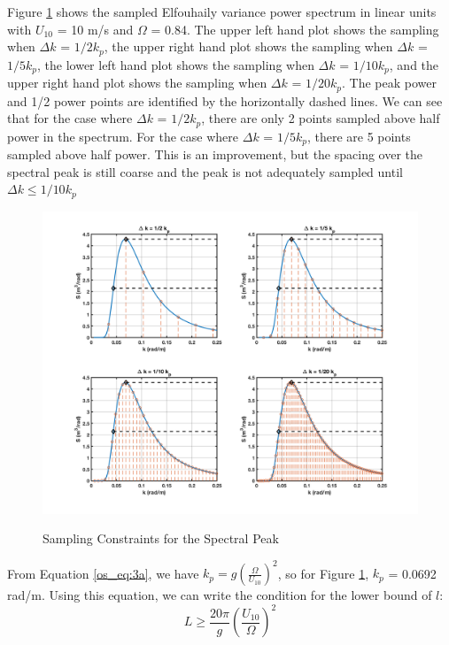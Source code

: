 Figure \ref{os_fig:6ba} shows the sampled Elfouhaily variance power spectrum in linear units with $U_{10}$ = 10 m/s and $\Omega$ = 0.84.  The upper left hand plot shows the sampling when $\Delta k$ = $1/2 k_p$, the upper right hand plot shows the sampling when $\Delta k$ = $1/5 k_p$, the lower left hand plot shows the sampling when $\Delta k$ = $1/10 k_p$, and the upper right hand plot shows the sampling when $\Delta k$ = $1/20 k_p$. The peak power and 1/2 power points are identified by the horizontally dashed lines. We can see that for the case where $\Delta k$ = $1/2 k_p$, there are only 2 points sampled above half power in the spectrum. For the case where $\Delta k$ = $1/5 k_p$, there are 5 points sampled above half power. This is an improvement, but the spacing over the spectral peak is still coarse and the peak is not adequately sampled until $\Delta k \leq 1/10 k_p$
\begin{figure}[H]
  \begin{center}
\includegraphics[width=6in]{../media/Ocean_Surface/spectral_peak_sampling.png}
  \end{center}
  \renewcommand{\baselinestretch}{1} \small\normalsize
  \begin{quote}
    \caption[Sampling Constraints for the Spectral Peak]{Sampling Constraints for the Spectral Peak\label{os_fig:6ba}}
  \end{quote}
\end{figure}
\renewcommand{\baselinestretch}{2} \small\normalsize

From Equation \ref{os_eq:3a}, we have $k_p = g\left(\frac{\Omega}{U_{10}}\right)^2$, so for Figure \ref{os_fig:6ba}, $k_p$ = 0.0692 rad/m. Using this equation, we can write the condition for the lower bound of $l$:
\begin{equation}
\label{os_eq:8o}
\boxed{L \geq \frac{20\pi}{g}\left(\frac{U_{10}}{\Omega} \right)^2}
\end{equation}

